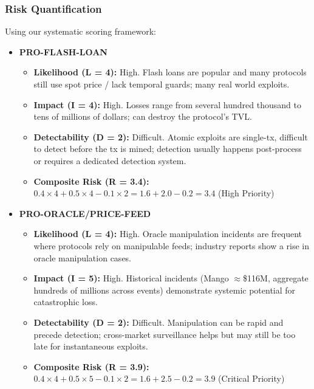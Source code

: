 \subsubsection{Risk Quantification}

Using our systematic scoring framework:

\begin{itemize}
    \item \textbf{PRO-FLASH-LOAN}
    \begin{itemize}
        \item \textbf{Likelihood (L = 4):} High. Flash loans are popular and many protocols still use spot price / lack temporal guards; many real world exploits. \cite{werapun2023faa, werner2022sok}
        \item \textbf{Impact (I = 4):} High. Losses range from several hundred thousand to tens of millions of dollars; can destroy the protocol's TVL. 
        \item \textbf{Detectability (D = 2):} Difficult. Atomic exploits are single-tx, difficult to detect before the tx is mined; detection usually happens post-process or requires a dedicated detection system. \cite{werapun2023faa}
        \item \textbf{Composite Risk (R = 3.4):} $0.4 \times 4 + 0.5 \times 4 - 0.1 \times 2 = 1.6 + 2.0 - 0.2 = 3.4$ (High Priority)
    \end{itemize}
    
    \item \textbf{PRO-ORACLE/PRICE-FEED}
    \begin{itemize}
        \item \textbf{Likelihood (L = 4):} High. Oracle manipulation incidents are frequent where protocols rely on manipulable feeds; industry reports show a rise in oracle manipulation cases.\cite{chainalysis2023oracle}
        \item \textbf{Impact (I = 5):} High. Historical incidents (Mango $\approx$\$116M, aggregate hundreds of millions across events) demonstrate systemic potential for catastrophic loss. \cite{akartuna2022mango}
        \item \textbf{Detectability (D = 2):} Difficult. Manipulation can be rapid and precede detection; cross-market surveillance helps but may still be too late for instantaneous exploits. \cite{solidus2022mango}
        \item \textbf{Composite Risk (R = 3.9):} $0.4 \times 4 + 0.5 \times 5 - 0.1 \times 2 = 1.6 + 2.5 - 0.2 = 3.9$ (Critical Priority)
    \end{itemize}
\end{itemize}